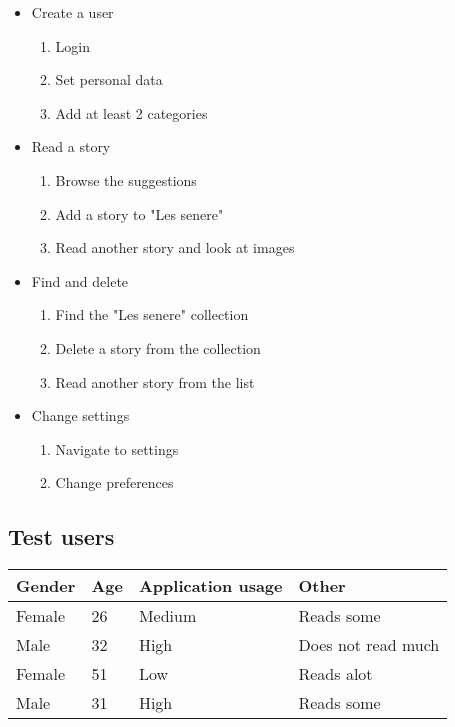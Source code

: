 {\begin{itemize}
	\item Create a user 	
		\begin{enumerate}
			\item Login 
			\item Set personal data 
			\item Add at least 2 categories 
		\end{enumerate}
	\item Read a story 
		\begin{enumerate}
			\item Browse the suggestions 
			\item Add a story to "Les senere" 
			\item Read another story and look at images 
		\end{enumerate}
	\item Find and delete 
		\begin{enumerate}
			\item Find the "Les senere" collection
			\item Delete a story from the collection
			\item Read another story from the list 
		\end{enumerate}
	\item Change settings 
		\begin{enumerate}
			\item Navigate to settings 
			\item Change preferences 
		\end{enumerate}
	
\end{itemize}

\subsection{Test users}

\begin{table}[H]
	\begin{center}
		\begin{tabular}{ | l | l | l | l |}
			\hline
			\textbf{Gender} & \textbf{Age} & \textbf{Application usage} & \textbf{Other} \\ \hline
			Female & 26 & Medium & Reads some \\\hline
			Male & 32 & High & Does not read much \\\hline
			Female & 51 & Low & Reads alot \\\hline
			Male & 31 & High & Reads some \\\hline 
			

\end{tabular}
\end{center}
\end{table}}

